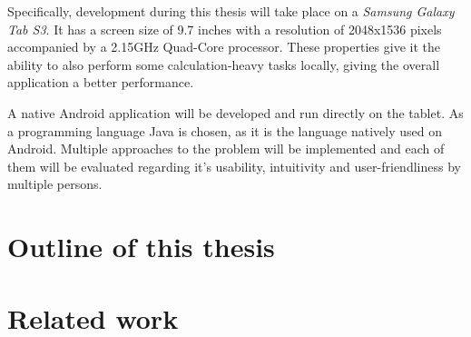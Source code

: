 Specifically, development during this thesis will take place on a \textit{Samsung Galaxy Tab S3}. It has a screen size of 9.7 inches\cite{samsung:galaxytabs3} with a resolution of 2048x1536 pixels accompanied by a 2.15GHz Quad-Core processor. These properties give it the ability to also perform some calculation-heavy tasks locally, giving the overall application a better performance.

A native Android application will be developed and run directly on the tablet. As a programming language Java is chosen, as it is the language natively used on Android. Multiple approaches to the problem will be implemented and each of them will be evaluated regarding it's usability, intuitivity and user-friendliness by multiple persons.

\section[Outline]{Outline of this thesis}

\section{Related work}